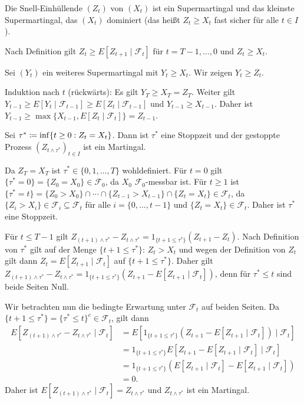 \documentclass[a4paper,twoside,DIV15,BCOR12mm]{scrbook}
\newcommand{\cF}{\mathcal F}
\begin{document}
\begin{satz}
\label{satz:2.10.4}Die Snell-Einhüllende $(Z_t)$ von $(X_t)$ ist ein Supermartingal und das kleinste Supermartingal, das $(X_t)$ dominiert (das heißt $Z_t\ge X_t$ fast sicher für alle $t\in I$).
\end{satz}

\begin{beweis}
Nach Definition gilt $Z_t \geq E[Z_{t+1}\mid \cF_t]$ für $t=T-1,\ldots,0$ und $Z_t \ge X_t$.

Sei $(Y_t)$ ein weiteres Supermartingal mit $Y_t \ge X_t$. Wir zeigen $Y_t \ge Z_t$.

Induktion nach $t$ (rückwärts): Es gilt $Y_T \ge X_T = Z_T$. Weiter gilt $Y_{t-1} \ge E[Y_t\mid \cF_{t-1}] \ge E[Z_t\mid \cF_{t-1}]$ und $Y_{t-1} \ge X_{t-1}$. Daher ist $Y_{t-1} \ge \max\{X_{t-1}, E[Z_t\mid \cF_t]\} = Z_{t-1}$.
\end{beweis}

\begin{lemma}
Sei $\tau^* \da \inf \{t\ge 0 : Z_t = X_t\}$. Dann ist $\tau^*$ eine Stoppzeit und der gestoppte Prozess $(Z_{t\wedge \tau^*})_{t\in I}$ ist ein Martingal.\label{lem:2.10.5}
\end{lemma}

\begin{beweis}
Da $Z_T=X_T$ ist $\tau^*\in\{0,1,\ldots,T\}$ wohldefiniert. Für $t=0$ gilt $\{\tau^*=0\} = \{Z_0=X_0\} \in \cF_0$, da $X_0$ $\cF_0$-messbar ist. Für $t\ge 1$ ist $\{\tau^* = t\} = \{Z_0 > X_0\}\cap\cdots\cap \{Z_{t-1} > X_{t-1}\}\cap \{Z_t = X_t \} \in \cF_t$, da $\{Z_i > X_i\} \in \cF_i \subseteq \cF_t$ für alle $i=\{0,\ldots,t-1\}$ und $\{Z_t=X_t\} \in \cF_t$. Daher ist $\tau^*$ eine Stoppzeit.

Für $t\le T-1$ gilt $Z_{(t+1)\wedge \tau^*} - Z_{t\wedge \tau^*} = 1_{\{t+1\le \tau^*\}}(Z_{t+1} - Z_t)$. Nach Definition von $\tau^*$ gilt auf der Menge $\{t+1\le \tau^*\}$: $Z_t > X_t$ und wegen der Definition von $Z_t$ gilt dann $Z_t = E[Z_{t+1} \mid \cF_t]$ auf $\{t+1 \le \tau^*\}$. Daher gilt $Z_{(t+1)\wedge \tau^*} - Z_{t\wedge \tau^*} = 1_{\{t+1\le \tau^*\}}(Z_{t+1} - E[Z_{t+1} \mid \cF_t])$, denn für $\tau^*\le t$ sind beide Seiten Null.

Wir betrachten nun die bedingte Erwartung unter $\cF_t$ auf beiden Seiten. Da $\{t+1\le \tau^*\} = \{\tau^* \le t\}^c \in \cF_t$, gilt dann
\begin{align*}
E[Z_{(t+1)\wedge \tau^*} - Z_{t\wedge \tau^*}\mid \cF_t]
&= E[1_{\{t+1\le \tau^*\}}(Z_{t+1} - E[Z_{t+1} \mid \cF_t])\mid \cF_t]\\
&= 1_{\{t+1\le \tau^*\}}E[Z_{t+1} - E[Z_{t+1} \mid \cF_t]\mid \cF_t]\\
&= 1_{\{t+1\le \tau^*\}}(E[Z_{t+1} \mid \cF_t] -E[Z_{t+1} \mid \cF_t])\\
&= 0.
\end{align*}
Daher ist $E[Z_{(t+1)\wedge \tau^*}\mid \cF_t] =  Z_{t\wedge \tau^*}$ und $Z_{t\wedge \tau^*}$ ist ein Martingal.
\end{beweis}
\end{document}
